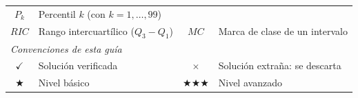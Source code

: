 \documentclass[11pt, letterpaper]{article}
\begin{document}
\begin{tcolorbox}[importantbox, title={Glosario de simbología}]
\begin{center}
\begin{tabular}{c p{4.5cm} | c p{4.5cm}}
\textcolor{zenitgold}{$P_k$} & \textcolor{zenitgold}{Percentil $k$ (con $k=1,\ldots,99$)}\\
\textcolor{zenitgold}{$RIC$} & \textcolor{zenitgold}{Rango intercuartílico ($Q_3-Q_1$)} &
\textcolor{zenitgold}{$MC$} & \textcolor{zenitgold}{Marca de clase de un intervalo}\\[4pt]
\multicolumn{4}{l}{\textit{Convenciones de esta guía}}\\
$\checkmark$ & Solución verificada &
$\times$ & Solución extraña: se descarta\\
$\bigstar$ & Nivel básico &
$\bigstar\bigstar\bigstar$ & Nivel avanzado\\
\bottomrule
\end{tabular}
\end{center}
\end{tcolorbox}

\medskip
\end{document}
